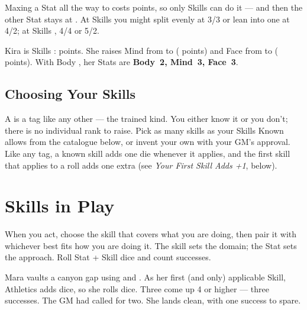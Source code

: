 Maxing a Stat all the way to  costs  points, so only
Skills  can do it --- and then the other Stat stays at
. At Skills  you might split evenly at 3/3 or lean
into one at 4/2; at Skills , 4/4 or 5/2.

\begin{example}
Kira is Skills :  points. She raises Mind from
 to  ( points) and Face from  to
 ( points). With Body , her Stats are
\textbf{Body~2, Mind~3, Face~3}.
\end{example}

\subsection*{Choosing Your Skills}
A  is a tag like any other --- the trained kind. You
either know it or you don't; there is no individual rank to raise. Pick
as many skills as your Skills Known allows from the catalogue below, or
invent your own with your GM's approval. Like any tag, a known skill
adds one die whenever it applies, and the first skill that applies to a
roll adds one extra (see \emph{Your First Skill Adds +1}, below).

\section{Skills in Play}

When you act, choose the skill that covers what you are doing, then pair
it with whichever  best fits how you are doing it. The skill
sets the domain; the Stat sets the approach. Roll Stat + Skill dice and
count successes.

\begin{example}
Mara vaults a canyon gap using   and
. As her first (and only) applicable Skill,
Athletics adds  dice, so she rolls  dice. Three come up 4 or
higher --- three successes. The GM had called for two. She lands clean,
with one success to spare.
\end{example}
